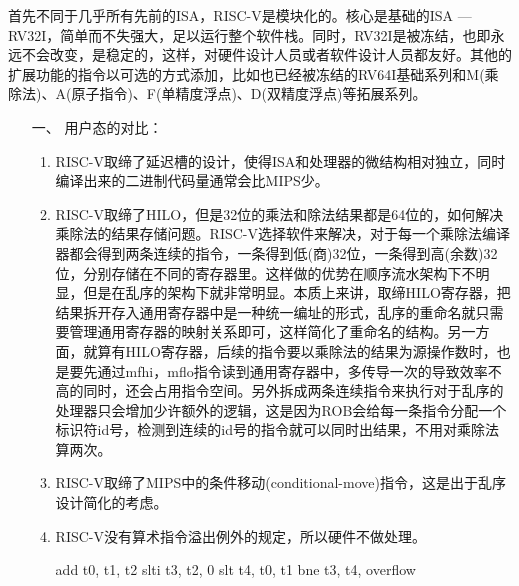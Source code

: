首先不同于几乎所有先前的ISA，RISC-V是模块化的。核心是基础的ISA --- RV32I，简单而不失强大，足以运行整个软件栈。同时，RV32I是被冻结，也即永远不会改变，是稳定的，这样，对硬件设计人员或者软件设计人员都友好。其他的扩展功能的指令以可选的方式添加，比如也已经被冻结的RV64I基础系列和M(乘除法)、A(原子指令)、F(单精度浮点)、D(双精度浮点)等拓展系列\citep{Patterson:2017:RRO:3202479}。
\begin{enumerate}%
	\item[一、] 用户态的对比：
	\begin{enumerate}[label=(\alph*)]
		\item RISC-V取缔了延迟槽的设计，使得ISA和处理器的微结构相对独立，同时编译出来的二进制代码量通常会比MIPS少。
		\item RISC-V取缔了HILO，但是32位的乘法和除法结果都是64位的，如何解决乘除法的结果存储问题。RISC-V选择软件来解决，对于每一个乘除法编译器都会得到两条连续的指令，一条得到低(商)32位，一条得到高(余数)32位，分别存储在不同的寄存器里。这样做的优势在顺序流水架构下不明显，但是在乱序的架构下就非常明显。本质上来讲，取缔HILO寄存器，把结果拆开存入通用寄存器中是一种统一编址的形式，乱序的重命名就只需要管理通用寄存器的映射关系即可，这样简化了重命名的结构。另一方面，就算有HILO寄存器，后续的指令要以乘除法的结果为源操作数时，也是要先通过mfhi，mflo指令读到通用寄存器中，多传导一次的导致效率不高的同时，还会占用指令空间。另外拆成两条连续指令来执行对于乱序的处理器只会增加少许额外的逻辑，这是因为ROB会给每一条指令分配一个标识符id号，检测到连续的id号的指令就可以同时出结果，不用对乘除法算两次。
		\item RISC-V取缔了MIPS中的条件移动(conditional-move)指令，这是出于乱序设计简化的考虑。
		\item RISC-V没有算术指令溢出例外的规定，所以硬件不做处理。
		\begin{scala}
			add t0, t1, t2
			slti t3, t2, 0
			slt t4, t0, t1
			bne t3, t4, overflow
		\end{scala}
	

\end{enumerate}
\end{enumerate}
